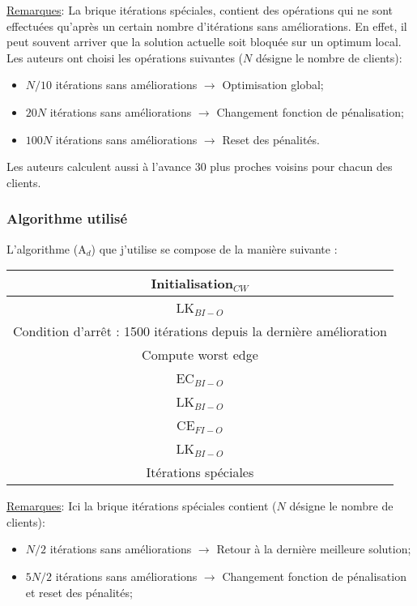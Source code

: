 \documentclass[a4paper,11pt]{article}%
\begin{document}
\underline{Remarques}: La brique itérations spéciales, contient des opérations qui ne sont effectuées qu'après un certain nombre d'itérations sans améliorations. En effet, il peut souvent arriver que la solution actuelle soit bloquée sur un optimum local. Les auteurs ont choisi les opérations suivantes ($N$ désigne le nombre de clients):
\begin{itemize}
\item $N/10$ itérations sans améliorations $\rightarrow$ Optimisation global;
\item $20N$ itérations sans améliorations $\rightarrow$ Changement fonction de pénalisation;
\item $100N$ itérations sans améliorations $\rightarrow$ Reset des pénalités.
\end{itemize} 

Les auteurs calculent aussi à l'avance $30$ plus proches voisins pour chacun des clients.

\subsubsection{Algorithme utilisé}

L'algorithme (A$_d$) que j'utilise se compose de la manière suivante :

\begin{center}
\begin{tabular}{|c|}

   \hline
   Initialisation$_{CW}$  \\
   \hline
   LK$_{BI-O}$ \\
   \hline
   \hline
   Condition d'arrêt : 1500 itérations depuis la dernière amélioration  \\
   \hline
   Compute worst edge \\
   \hline
   EC$_{BI-O}$ \\
   \hline
   LK$_{BI-O}$ \\
   \hline
   CE$_{FI-O}$ \\
   \hline
   LK$_{BI-O}$ \\
   \hline
   Itérations spéciales \\
   \hline
   \hline
   
\end{tabular}
\end{center}

\underline{Remarques}: Ici la brique itérations spéciales contient ($N$ désigne le nombre de clients):
\begin{itemize}
\item $N/2$ itérations sans améliorations $\rightarrow$ Retour à la dernière meilleure solution;
\item $5N/2$ itérations sans améliorations $\rightarrow$ Changement fonction de pénalisation et reset des pénalités;
\end{itemize} 
\end{document}
